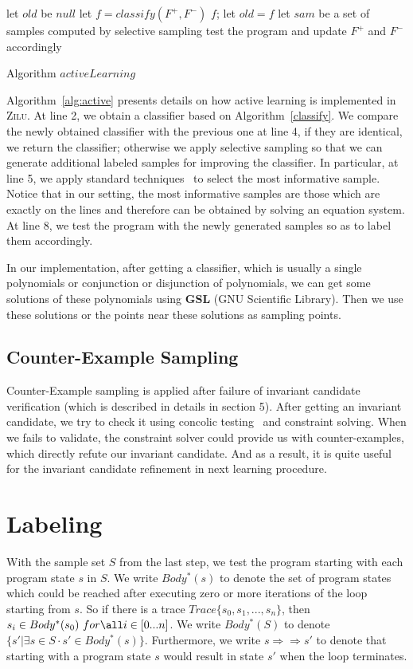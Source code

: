 \begin{algorithm}[t]
\SetAlgoVlined
\Indm
{}
\Indp
let $old$ be $null$\;
 {
    let $f = classify(F^+, F^-)$\;
     {
        \Return $f$;
    }
    let $old = f$\;
    let $sam$ be a set of samples computed by selective sampling\;
    test the program and update $F^+$ and $F^-$ accordingly\;
}
\caption{Algorithm $activeLearning$}
\label{alg:active}
\end{algorithm}

Algorithm~\ref{alg:active} presents details on how active learning is implemented in \textsc{Zilu}. 
At line 2, we obtain a classifier based on Algorithm~\ref{classify}. 
We compare the newly obtained classifier with the previous one at line 4, if they are identical, we return the classifier; 
otherwise we apply selective sampling so that we can generate additional labeled samples for improving the classifier. 
In particular, at line 5, we apply standard techniques~\cite{DBLP:conf/icml/SchohnC00} to select the most informative sample. 
Notice that in our setting, the most informative samples are those which are exactly on the lines and therefore can be obtained by solving an equation system. 
At line 8, we test the program with the newly generated samples so as to label them accordingly.

In our implementation, after getting a classifier, which is usually a single polynomials or conjunction or disjunction of polynomials,
we can get some solutions of these polynomials using \textbf{GSL} (GNU Scientific Library).
Then we use these solutions or the points near these solutions as sampling points.


\subsection{Counter-Example Sampling}
Counter-Example sampling is applied after failure of invariant candidate verification (which is described in details in section 5).
After getting an invariant candidate, we try to check it using concolic testing~\cite{} and constraint solving.
When we fails to validate, the constraint solver could provide us with counter-examples, 
which directly refute our invariant candidate.
And as a result, it is quite useful for the invariant candidate refinement in next learning procedure.



\section {Labeling}
With the sample set $S$ from the last step, we test the program starting with each program state $s$ in $S$. 
We write $Body^*(s)$ to denote the set of program states which could be reached after executing zero or more iterations of the loop starting from $s$.
So if there is a trace $Trace\{s_0, s_1, ..., s_n\}$, then $s_i\in Body^*(s_0)\ for \all i \in [0...n]$.
We write $Body^*(S)$ to denote $\{s' | \exists s \in S \cdot s' \in Body^*(s)\}$. 
Furthermore, we write $s \Rightarrow\Rightarrow s'$ to denote that starting with a program state $s$ would result in state $s'$ when the loop terminates. 

